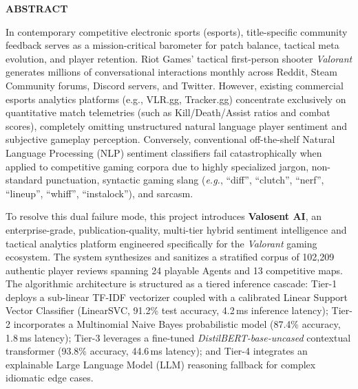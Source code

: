 \newpage
\thispagestyle{plain}
\begin{center}
    {\Large \bfseries \color{krmunavy} ABSTRACT}\\[0.8cm]
\end{center}

\noindent In contemporary competitive electronic sports (esports), title-specific community feedback serves as a mission-critical barometer for patch balance, tactical meta evolution, and player retention. Riot Games' tactical first-person shooter \textit{Valorant} generates millions of conversational interactions monthly across Reddit, Steam Community forums, Discord servers, and Twitter. However, existing commercial esports analytics platforms (e.g., VLR.gg, Tracker.gg) concentrate exclusively on quantitative match telemetries (such as Kill/Death/Assist ratios and combat scores), completely omitting unstructured natural language player sentiment and subjective gameplay perception. Conversely, conventional off-the-shelf Natural Language Processing (NLP) sentiment classifiers fail catastrophically when applied to competitive gaming corpora due to highly specialized jargon, non-standard punctuation, syntactic gaming slang (\textit{e.g.}, ``diff'', ``clutch'', ``nerf'', ``lineup'', ``whiff'', ``instalock''), and sarcasm.

\vspace{0.4cm}
\noindent To resolve this dual failure mode, this project introduces \textbf{Valosent AI}, an enterprise-grade, publication-quality, multi-tier hybrid sentiment intelligence and tactical analytics platform engineered specifically for the \textit{Valorant} gaming ecosystem. The system synthesizes and sanitizes a stratified corpus of 102,209 authentic player reviews spanning 24 playable Agents and 13 competitive maps. The algorithmic architecture is structured as a tiered inference cascade: Tier-1 deploys a sub-linear TF-IDF vectorizer coupled with a calibrated Linear Support Vector Classifier (LinearSVC, 91.2\% test accuracy, 4.2\,ms inference latency); Tier-2 incorporates a Multinomial Naive Bayes probabilistic model (87.4\% accuracy, 1.8\,ms latency); Tier-3 leverages a fine-tuned \textit{DistilBERT-base-uncased} contextual transformer (93.8\% accuracy, 44.6\,ms latency); and Tier-4 integrates an explainable Large Language Model (LLM) reasoning fallback for complex idiomatic edge cases.

